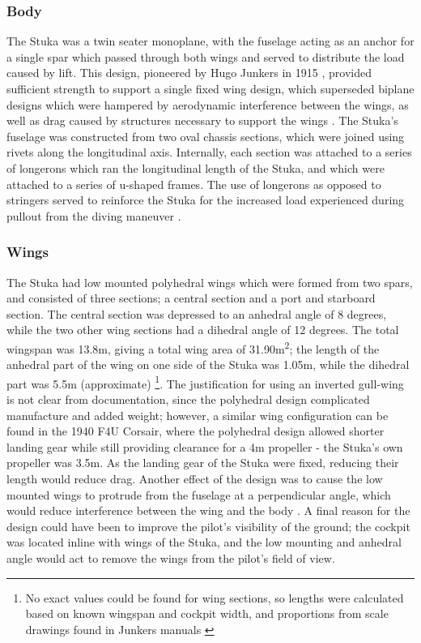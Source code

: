 \documentclass[a4paper, fontsize=11pt]{scrartcl} %
\begin{document}
\subsubsection{Body}
The Stuka was a twin seater monoplane, with the fuselage acting as an
anchor for a single spar which passed through both wings and served to
distribute the load caused by lift.
This design, pioneered by Hugo Junkers in 1915 \autocite{nasa4}, provided sufficient
strength to support a single fixed wing design, which superseded
biplane designs which were hampered by aerodynamic interference
between the wings, as well as drag caused by structures
necessary to support the wings \autocite[p~.37]{peery12}.
The Stuka's fuselage was constructed from two oval
chassis sections, which were joined using rivets along the longitudinal
axis.  Internally, each section was attached to a series of longerons
which ran the longitudinal length of the Stuka, and which were attached
to a series of u-shaped frames. The use of longerons as opposed to
stringers served to reinforce the Stuka for the increased load
experienced during pullout from the diving maneuver \autocite{peery12}.

\subsubsection{Wings}
The Stuka had low mounted polyhedral wings which were formed from two spars, and consisted of
three sections; a central section and a port and starboard section. The
central section was depressed to an anhedral angle of 8 degrees, while
the two other wing sections had a dihedral angle of 12
degrees. The total wingspan was 13.8m, giving a total wing area of
31.90m\textsuperscript{2}; the length of the anhedral
part of the wing on one side of the Stuka was 1.05m, while the dihedral part was
5.5m (approximate) \footnote{No exact values could be found for wing
sections, so lengths were calculated based on known wingspan and cockpit
width, and proportions from scale drawings found in Junkers manuals
\autocite{manual39}}. The justification for using an inverted gull-wing
is not clear from documentation, since the polyhedral
design complicated manufacture and added weight; however, a similar wing
configuration can be found in the 1940 F4U Corsair, where the polyhedral
design allowed shorter landing gear while still providing clearance
for a 4m propeller \autocite{usni} - the Stuka's own propeller was 3.5m.
As the landing gear of the Stuka were fixed, reducing their length would reduce
drag. Another effect of the design was to cause the low
mounted wings to protrude from the fuselage at a perpendicular angle,
which would reduce interference between the wing and the body
\autocite[p~.203]{hartshorn31}. A final reason for the design could have
been to improve the pilot's visibility of the ground; the cockpit was
located inline with wings of the Stuka, and the low mounting and
anhedral angle would act to remove the wings from the pilot's field of
view.
\end{document}

